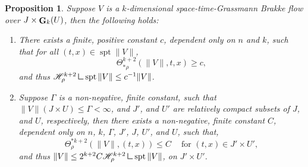 \documentclass{article}
\theoremstyle{plain}
\theoremstyle{definition}
\theoremstyle{plain}
\newtheorem{proposition}[theorem]{Proposition}
\theoremstyle{remark}
\theoremstyle{remark}
\theoremstyle{plain}
\newcommand{\weight}{\mathbin{\vrule height 1.6ex depth 0pt width
		0.14ex\vrule height 0.14ex depth 0pt width 1.3ex}}
\DeclareMathOperator{\G}{{\bf G}}
\DeclareMathOperator{\spt}{spt}
\begin{document}
\begin{proposition}\label{prop: density bounds}
Suppose $V$ is a $k$-dimensional space-time-Grassmann Brakke flow over $J \times \G_{k} (U)$, then the following holds: 
    \begin{enumerate}[label=\ref{prop: density bounds}.\arabic{enumi}]
        \item\label{prop: lower density bound} There exists a finite, positive constant $c$, dependent only on $n$ and $k$, such that for all $(t, x) \in \spt  \| V \|$,
        \begin{equation*}
            \Theta_{* \rho}^{k + 2} (\| V \|, t, x) \geq  c,
        \end{equation*}
        and thus $\mathscr{H}_{\rho}^{k + 2} \weight \mathrm{spt} \, \| V \| \leq c^{-1} \| V \|$.
        \item\label{prop: upper density bounds} Suppose $\Gamma$ is a non-negative, finite constant, such that $\| V \| (J \times U) \leq \Gamma <\infty$, and $J'$, and $U'$ are relatively compact subsets of $J$, and $U$, respectively, then there exists a non-negative, finite constant $C$, dependent only on $n$, $k$, $\Gamma$, $J'$, $J$, $U'$, and $U$, such that, 
        \begin{equation*}
            \Theta_{\rho}^{* k + 2} ( \| V \|, (t, x)) \leq C \ \quad \text{for $(t,x)\in J'\times U'$},
        \end{equation*}
        and thus $\| V \| \leq 2^{k + 2} C \mathscr{H}_{\rho}^{k + 2} \weight \mathrm{spt} \, \| V \|$, on $J' \times U'$.
    \end{enumerate}
\end{proposition}
\end{document}
